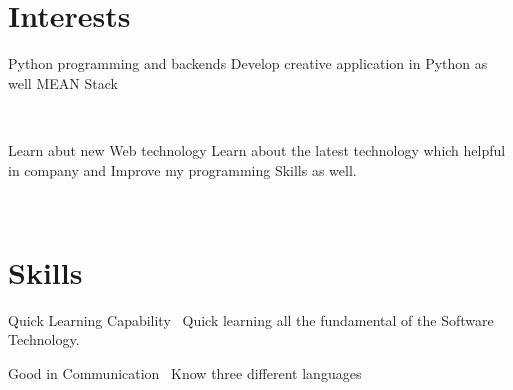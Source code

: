 \documentclass[]{cv-style}
\begin{document}

\section{Interests}
  \vspace{-0.3cm}
\begin{entrylist}
\entry
{}
{Python programming and backends}
{}
{Develop creative application in Python as well MEAN Stack}

\end{entrylist}\
\begin{entrylist}
\entry
{}
{Learn abut new Web technology}
{}
{Learn about the latest technology which helpful in company and Improve my programming Skills as well.}
\end{entrylist}\


\section{Skills}
  \vspace{-0.2cm}

\begin{entrylist}

\entry
  {}
  {Quick Learning Capability }
  {}
  {\jobtitle{}\  Quick learning all the fundamental of the Software Technology.}
  
  \entry
  {}
  { Good in Communication}
  {}
  {\jobtitle{}\ Know three different languages }

  

\end{entrylist}
\end{document}
